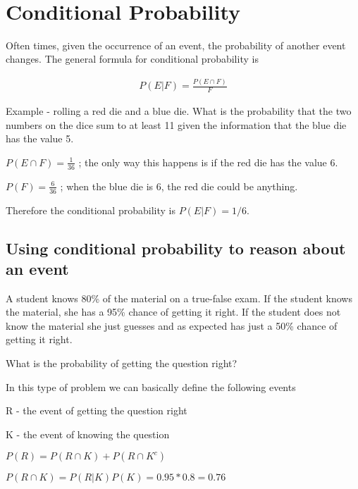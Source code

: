 \documentclass[12pt]{article}
\begin{document}
\begin{center}
\\
\vspace{1cm}
\end{center}

\vspace{0.5cm}\noindent


\section*{Conditional Probability}
Often times, given the occurrence of an event, the probability of another event changes. The general formula for conditional probability is

\begin{align*}
P(E|F) = \frac{P(E \cap F)}{F}
\end{align*}

Example - rolling a red die and a blue die. What is the probability that the two numbers on the dice sum to at least 11 given the information that the blue die has the value 5.

$P(E \cap F) = \frac{1}{36}$ ; the only way this happens is if the red die has the value 6.

$P(F) = \frac{6}{36}$ ; when the blue die is 6, the red die could be anything.

Therefore the conditional probability is $P(E|F) = 1/6$.

\subsection*{Using conditional probability to reason about an event}

A student knows 80\% of the material on a true-false exam. If the student knows the material, she has a 95\% chance of getting it right. If the student does not know the material she just guesses and as expected has just a 50\% chance of getting it right.

What is the probability of getting the question right?

In this type of problem we can basically define the following events

R - the event of getting the question right

K - the event of knowing the question

$P(R) = P(R \cap K) + P(R \cap K^c)$

$P(R \cap K) = P(R|K)P(K) = 0.95 * 0.8 = 0.76$
\end{document}
